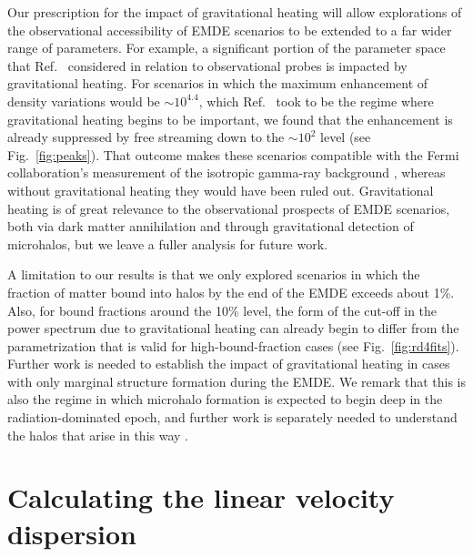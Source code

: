 \documentclass[a4paper,11pt]{article}
\begin{document}
Our prescription for the impact of gravitational heating will allow explorations of the observational accessibility of EMDE scenarios to be extended to a far wider range of parameters.
For example, a significant portion of the parameter space that Ref.~\cite{hg23} considered in relation to observational probes is impacted by gravitational heating. For scenarios in which the maximum enhancement of density variations would be $\sim 10^{4.4}$, which Ref.~\cite{hg23} took to be the regime where gravitational heating begins to be important, we found that the enhancement is already suppressed by free streaming down to the $\sim 10^2$ level (see Fig.~\ref{fig:peaks}). That outcome makes these scenarios compatible with the Fermi collaboration's measurement of the isotropic gamma-ray background \cite{igrb}, whereas without gravitational heating they would have been ruled out. Gravitational heating is of great relevance to the observational prospects of EMDE scenarios, both via dark matter annihilation and through gravitational detection of microhalos, but we leave a fuller analysis for future work.

A limitation to our results is that we only explored scenarios in which the fraction of matter bound into halos by the end of the EMDE exceeds about 1\%.
Also, for bound fractions around the 10\% level, the form of the cut-off in the power spectrum due to gravitational heating can already begin to differ from the parametrization that is valid for high-bound-fraction cases (see Fig.~\ref{fig:rd4fits}).
Further work is needed to establish the impact of gravitational heating in cases with only marginal structure formation during the EMDE. We remark that this is also the regime in which microhalo formation is expected to begin deep in the radiation-dominated epoch, and further work is separately needed to understand the halos that arise in this way \cite{2023PhRvD.107h3505D}.


\appendix

\section{Calculating the linear velocity dispersion}
\label{linsigv}
\end{document}
